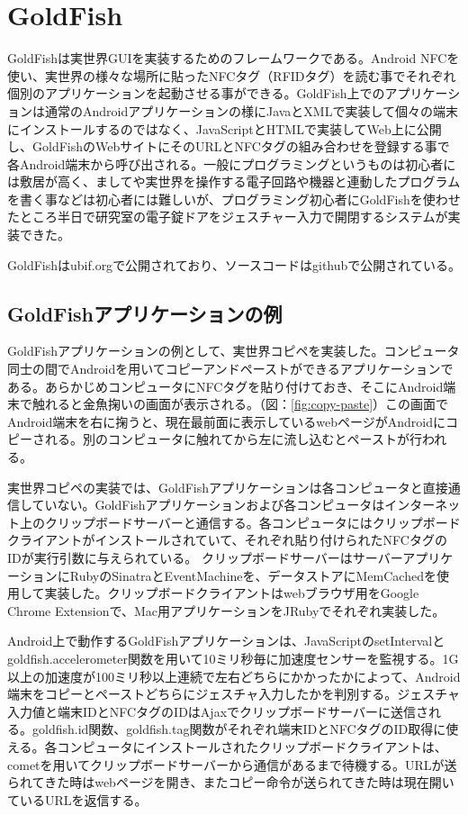 \section{GoldFish}
GoldFishは実世界GUIを実装するためのフレームワークである。Android NFCを使い、実世界の様々な場所に貼ったNFCタグ（RFIDタグ）を読む事でそれぞれ個別のアプリケーションを起動させる事ができる。GoldFish上でのアプリケーションは通常のAndroidアプリケーションの様にJavaとXMLで実装して個々の端末にインストールするのではなく、JavaScriptとHTMLで実装してWeb上に公開し、GoldFishのWebサイトにそのURLとNFCタグの組み合わせを登録する事で各Android端末から呼び出される。一般にプログラミングというものは初心者には敷居が高く、ましてや実世界を操作する電子回路や機器と連動したプログラムを書く事などは初心者には難しいが、プログラミング初心者にGoldFishを使わせたところ半日で研究室の電子錠ドアをジェスチャー入力で開閉するシステムが実装できた。

GoldFishはubif.org\cite{goldfish}で公開されており、ソースコードはgithubで公開されている。\cite{github}


\subsection{GoldFishアプリケーションの例}
GoldFishアプリケーションの例として、実世界コピペを実装した。コンピュータ同士の間でAndroidを用いてコピーアンドペーストができるアプリケーションである。あらかじめコンピュータにNFCタグを貼り付けておき、そこにAndroid端末で触れると金魚掬いの画面が表示される。（図：\ref{fig:copy-paste}）この画面でAndroid端末を右に掬うと、現在最前面に表示しているwebページがAndroidにコピーされる。別のコンピュータに触れてから左に流し込むとペーストが行われる。

実世界コピペの実装では、GoldFishアプリケーションは各コンピュータと直接通信していない。GoldFishアプリケーションおよび各コンピュータはインターネット上のクリップボードサーバーと通信する。各コンピュータにはクリップボードクライアントがインストールされていて、それぞれ貼り付けられたNFCタグのIDが実行引数に与えられている。
クリップボードサーバーはサーバーアプリケーションにRubyのSinatraとEventMachineを、データストアにMemCachedを使用して実装した。クリップボードクライアントはwebブラウザ用をGoogle Chrome Extensionで、Mac用アプリケーションをJRubyでそれぞれ実装した。

Android上で動作するGoldFishアプリケーションは、JavaScriptのsetIntervalとgoldfish.accelerometer関数を用いて10ミリ秒毎に加速度センサーを監視する。1G以上の加速度が100ミリ秒以上連続で左右どちらにかかったかによって、Android端末をコピーとペーストどちらにジェスチャ入力したかを判別する。ジェスチャ入力値と端末IDとNFCタグのIDはAjaxでクリップボードサーバーに送信される。goldfish.id関数、goldfish.tag関数がそれぞれ端末IDとNFCタグのID取得に使える。各コンピュータにインストールされたクリップボードクライアントは、cometを用いてクリップボードサーバーから通信があるまで待機する。URLが送られてきた時はwebページを開き、またコピー命令が送られてきた時は現在開いているURLを返信する。

